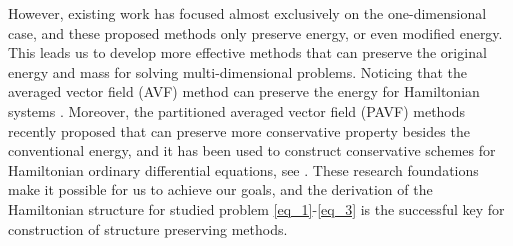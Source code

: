 \documentclass[preprint,compress,3p,10pt,fleqn]{elsarticle}
\numberwithin{equation}{section}
\begin{document}
However, existing work has focused almost exclusively on the one-dimensional case, and these proposed methods only preserve energy, or even modified energy. This leads us to develop more effective methods that can preserve the original energy and mass for solving multi-dimensional problems.
Noticing that the averaged vector field (AVF) method can preserve the energy for Hamiltonian systems \cite{buddGeometricIntegrationUsing1999,quispelNewClassEnergypreserving2008}. Moreover, the partitioned averaged vector field (PAVF) methods recently proposed that can preserve  more conservative property besides the conventional energy, and it has been used to construct conservative schemes for Hamiltonian ordinary differential equations, see \cite{caiPartitionedAveragedVector2018}. These research foundations make it possible for us to achieve our goals, and the derivation of the Hamiltonian structure for studied problem \eqref{eq_1}-\eqref{eq_3} is the successful key for construction of structure preserving methods.


\end{document}
